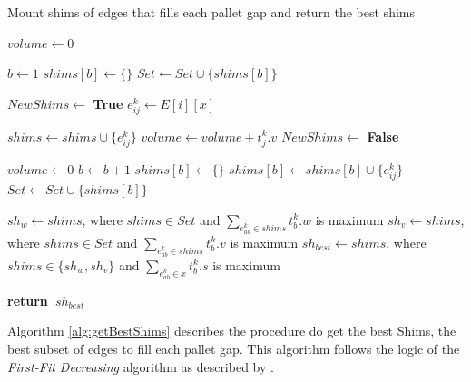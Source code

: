 \documentclass[preprint,authoryear]{elsarticle}
\renewcommand{\Return}{\State \bf {return}~}
\begin{document}
\begin{algorithm}[H]
	\caption{Mount shims of edges that fills each pallet gap and return the best shims}  \label{alg:getBestShims}
	\begin{algorithmic}[1]
		
		
		\State $volume \gets 0$	
		
		\State $b \gets 1$
		\State $shims[b] \gets \{\}$  \label{empty_shims}
		\State $Set \gets Set \cup \{shims[b]\}$ \label{empty_set}
		
		 \label{edges_indexes}
		
		
		\State $NewShims \gets$ {\bf True} \label{new_shims}
		\State $e_{ij}^k \gets E[i][x]$
		
		 \label{shims_set}
		
		
		
		\State $shims \gets shims \cup \{e_{ij}^k\}$
		\State $volume \gets volume + t_j^k.v$
		\State $NewShims \gets$ {\bf False} \label{new_shims_false}
		
		
		\EndIf
		
		\EndFor 
		
		 \label{new_shims2}
		\State $volume \gets 0$
		\State $b \gets b + 1$
		\State $shims[b] \gets \{\}$
		\State $shims[b] \gets shims[b] \cup \{e_{ij}^k\}$
		\State $Set \gets Set \cup \{shims[b]\}$
		\EndIf
		
		\EndFor 
		
		\State $sh_w \gets shims$, where $shims \in Set$ and $\sum_{e_{ab}^k \in shims} t_b^k.w$ is maximum  \label{best_weight}		
		\State $sh_v \gets shims$, where $shims \in Set$ and $\sum_{e_{ab}^k \in shims} t_b^k.v$ is maximum \label{best_volume}
		\State $sh_{best} \gets shims$, where $shims \in \{sh_w, sh_v\}$ and $\sum_{e_{ab}^k \in x} t_b^k.s$ is maximum \label{best_score}
		
		\Return $sh_{best}$
		
		\EndProcedure
		
	\end{algorithmic}
\end{algorithm}

Algorithm \ref{alg:getBestShims} describes the procedure do get the best Shims, the best subset of edges to fill each pallet gap. This algorithm follows the logic of the {\it First-Fit Decreasing} algorithm as described by \cite{JohnsonGarey1985}.
\end{document}
